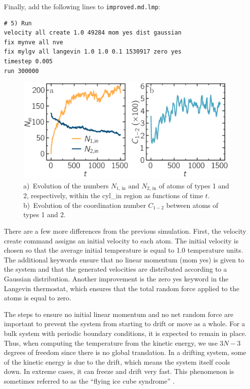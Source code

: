 \documentclass[9pt,tutorial]{livecoms}
\newcommand{\lmpcmd}[1]{\hspace{0pt}\colorbox{listing}{\textcolor{command}{\small{#1}}}\hspace{0pt}} %
\newcommand{\flecmd}[1]{\textcolor{command}{\texttt{#1}}} %
\begin{document}
Finally, add the following lines to \flecmd{improved.md.lmp}:
\begin{lstlisting}
# 5) Run
velocity all create 1.0 49284 mom yes dist gaussian
fix mynve all nve
fix mylgv all langevin 1.0 1.0 0.1 1530917 zero yes
timestep 0.005
run 300000
\end{lstlisting}

\begin{figure}
\centering
\includegraphics[width=\linewidth]{LJ-mixing}
\caption{a)~Evolution of the numbers $N_\text{1, in}$ and $N_\text{2, in}$ of atoms
of types 1 and 2, respectively, within the \lmpcmd{cyl\_in} region as functions
of time $t$.  b)~Evolution of the coordination number $C_{1-2}$ between atoms of types 1 and 2.}
\label{fig:mixing}
\end{figure}

There are a few more differences from the previous simulation.  First,
the \lmpcmd{velocity create} command assigns an initial velocity to each
atom.  The initial velocity is chosen so that the average initial
temperature is equal to 1.0 temperature units.  The additional keywords
ensure that no linear momentum (\lmpcmd{mom yes}) is given to the
system and that the generated velocities are distributed according to
a Gaussian distribution.  Another improvement is the \lmpcmd{zero yes}
keyword in the Langevin thermostat, which ensures that the total random
force applied to the atoms is equal to zero.

\begin{note}
  The steps to ensure no initial linear momentum and no net random
  force are important to prevent the system from starting to drift or move as a
  whole.  For a bulk system with periodic boundary conditions, it is
  expected to remain in place.  Thus, when computing the temperature from the
  kinetic energy, we use $3N-3$ degrees of freedom since there is no
  global translation.  In a drifting system, some of the kinetic energy is
  due to the drift, which means the system itself cools down.  In
  extreme cases, it can freeze and drift very fast.  This phenomenon is
  sometimes referred to as the ``flying ice cube syndrome'' \cite{wong2016good}.
\end{note}
\end{document}
